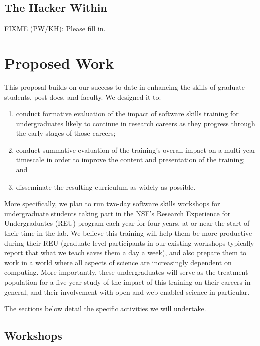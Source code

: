 \documentclass[11pt]{article}
\newcommand{\fixme}[2]{FIXME (#1): {#2}}
\begin{document}
\subsection{The Hacker Within}

\fixme{PW/KH}{Please fill in.}

\section{Proposed Work}

This proposal builds on our success to date in enhancing the skills of
graduate students, post-docs, and faculty.  We designed it to:

\begin{enumerate}

\item
  conduct formative evaluation of the impact of software skills
  training for undergraduates likely to continue in research careers
  as they progress through the early stages of those careers;

\item
  conduct summative evaluation of the training's overall impact on a
  multi-year timescale in order to improve the content and
  presentation of the training; and

\item
  disseminate the resulting curriculum as widely as possible.

\end{enumerate}

More specifically, we plan to run two-day software skills workshops
for undergraduate students taking part in the NSF's Research
Experience for Undergraduates (REU) program each year for four years,
at or near the start of their time in the lab.  We believe this
training will help them be more productive during their REU
(graduate-level participants in our existing workshops typically
report that what we teach saves them a day a week), and also prepare
them to work in a world where all aspects of science are increasingly
dependent on computing.  More importantly, these undergraduates will
serve as the treatment population for a five-year study of the impact
of this training on their careers in general, and their involvement
with open and web-enabled science in particular.

The sections below detail the specific activities we will undertake.

\subsection{Workshops}
\end{document}
